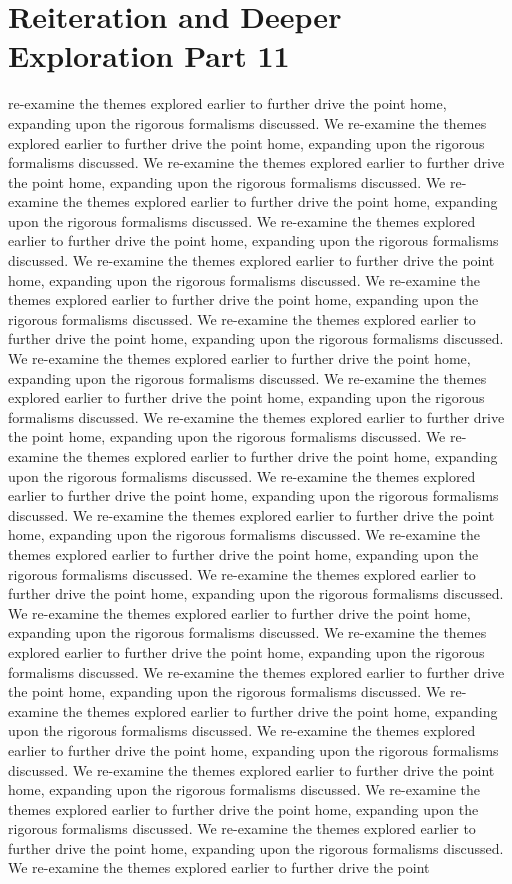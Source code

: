 \section{Reiteration and Deeper Exploration Part 11}\nWe re-examine the themes explored earlier to further drive the point home, expanding upon the rigorous formalisms discussed. We re-examine the themes explored earlier to further drive the point home, expanding upon the rigorous formalisms discussed. We re-examine the themes explored earlier to further drive the point home, expanding upon the rigorous formalisms discussed. We re-examine the themes explored earlier to further drive the point home, expanding upon the rigorous formalisms discussed. We re-examine the themes explored earlier to further drive the point home, expanding upon the rigorous formalisms discussed. We re-examine the themes explored earlier to further drive the point home, expanding upon the rigorous formalisms discussed. We re-examine the themes explored earlier to further drive the point home, expanding upon the rigorous formalisms discussed. We re-examine the themes explored earlier to further drive the point home, expanding upon the rigorous formalisms discussed. We re-examine the themes explored earlier to further drive the point home, expanding upon the rigorous formalisms discussed. We re-examine the themes explored earlier to further drive the point home, expanding upon the rigorous formalisms discussed. We re-examine the themes explored earlier to further drive the point home, expanding upon the rigorous formalisms discussed. We re-examine the themes explored earlier to further drive the point home, expanding upon the rigorous formalisms discussed. We re-examine the themes explored earlier to further drive the point home, expanding upon the rigorous formalisms discussed. We re-examine the themes explored earlier to further drive the point home, expanding upon the rigorous formalisms discussed. We re-examine the themes explored earlier to further drive the point home, expanding upon the rigorous formalisms discussed. We re-examine the themes explored earlier to further drive the point home, expanding upon the rigorous formalisms discussed. We re-examine the themes explored earlier to further drive the point home, expanding upon the rigorous formalisms discussed. We re-examine the themes explored earlier to further drive the point home, expanding upon the rigorous formalisms discussed. We re-examine the themes explored earlier to further drive the point home, expanding upon the rigorous formalisms discussed. We re-examine the themes explored earlier to further drive the point home, expanding upon the rigorous formalisms discussed. We re-examine the themes explored earlier to further drive the point home, expanding upon the rigorous formalisms discussed. We re-examine the themes explored earlier to further drive the point home, expanding upon the rigorous formalisms discussed. We re-examine the themes explored earlier to further drive the point home, expanding upon the rigorous formalisms discussed. We re-examine the themes explored earlier to further drive the point home, expanding upon the rigorous formalisms discussed. We re-examine the themes explored earlier to further drive the point 